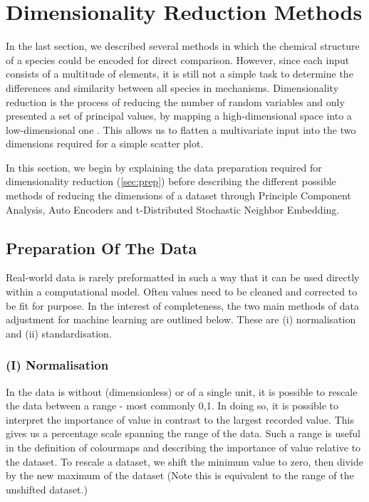 \section{ Dimensionality Reduction Methods}\label{sec:dr}
In the last section, we described several methods in which the chemical structure of a species could be encoded for direct comparison. However, since each input consists of a multitude of elements, it is still not a simple task to determine the differences and similarity between all species in mechanisms. Dimensionality reduction is the process of reducing the number of random variables and only presented a set of principal values, by mapping a high-dimensional space into a low-dimensional one \citep{drrandom}. This allows us to flatten a multivariate input into the two dimensions required for a simple scatter plot.

In this section, we begin by explaining the data preparation required for dimensionality reduction (\autoref{sec:prep}) before describing the different possible methods of reducing the dimensions of a dataset through Principle Component Analysis, Auto Encoders and t-Distributed Stochastic Neighbor Embedding.

\subsection{Preparation Of The Data}\label{sec:prep}
Real-world data is rarely preformatted in such a way that it can be used directly within a computational model. Often values need to be cleaned and corrected to be fit for purpose. In the interest of completeness, the two main methods of data adjustment for machine learning are outlined below. These are (i) normalisation and (ii) standardisation.


\subsubsection*{(I) Normalisation}
In the data is without (dimensionless) or of a single unit, it is possible to rescale the data between a range - most commonly {0,1}. In doing so, it is possible to interpret the importance of value in contrast to the largest recorded value. This gives us a percentage scale spanning the range of the data. Such a range is useful in the definition of colourmaps and describing the importance of value relative to the dataset.
To rescale a dataset, we shift the minimum value to zero, then divide by the new maximum of the dataset (Note this is equivalent to the range of the unshifted dataset.)

